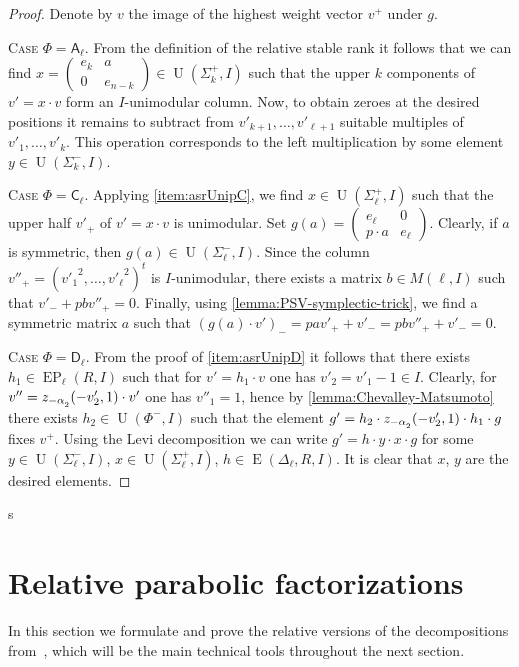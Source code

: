 \documentclass[oneside, 12pt]{amsart}
\theoremstyle{plain}
\numberwithin{equation}{section}
\numberwithin{lemma}{section}
\theoremstyle{definition}
\theoremstyle{remark}
\DeclareMathOperator{\E}{E}
\DeclareMathOperator{\EP}{EP}
\DeclareMathOperator{\U}{U}
\newcommand{\rA}{\mathsf{A}}
\newcommand{\rC}{\mathsf{C}}
\newcommand{\rD}{\mathsf{D}}
\def\ssub#1{\mathchoice
   {_{\lower2pt\hbox{$\scriptstyle #1$}}}
   {_{\lower2pt\hbox{$\scriptstyle #1$}}}
   {_{\lower1.5pt\hbox{$\scriptscriptstyle #1$}}}
   {_{\!\lower1.5pt\hbox{$\scriptscriptstyle #1$}}}}
\begin{document}
\begin{proof} Denote by $v$ the image of the highest weight vector $v^+$ under $g$.

\textsc{Case $\Phi=\rA_\ell$.} From the definition of the relative stable rank it follows that we can find 
$x= \left(\begin{smallmatrix} e_k & a \\ 0 & e_{n-k} \end{smallmatrix}\right) \in \U(\Sigma_k^+, I)$ such that 
the upper $k$ components of $v'= x \cdot v$ form an $I$-unimodular column. 
Now, to obtain zeroes at the desired positions it remains to subtract from $v'_{k+1},\ldots, v'_{\ell+1}$ suitable multiples of $v'_1, \ldots, v'_k$.
This operation corresponds to the left multiplication by some element $y\in\U(\Sigma_k^-, I)$.

\textsc{Case $\Phi=\rC_\ell$.} 
Applying \cref{item:asrUnipC}, we find $x \in \U(\Sigma_\ell^+, I)$ such that the upper half $v'_+$ of $v' = x \cdot v$ is unimodular.
Set $g(a) = \left(\begin{smallmatrix} e_\ell & 0 \\ p \cdot a & e_{\ell} \end{smallmatrix}\right)$.
Clearly, if $a$ is symmetric, then $g(a) \in \U(\Sigma_\ell^-, I)$.
Since the column $v''_+ = ({v'_1}^2, \ldots, {v'_\ell}^2)^t$ is $I$-unimodular, there exists a matrix $b \in M(\ell, I)$ such that $v'_- + p b v''_+ = 0$.
Finally, using \cref{lemma:PSV-symplectic-trick}, we find a symmetric matrix $a$ such that $(g(a) \cdot v')_- = p a v'_+ + v'_- = p b v''_+ + v'_- = 0$.

\textsc{Case $\Phi=\rD_\ell$.} From the proof of \cref{item:asrUnipD} it follows that there exists $h_1 \in \EP_\ell(R, I)$ such that for $v'=h_1\cdot v$ one has $v'_2=v'_1-1\in I$.
Clearly, for $v'' = z_{-\alpha\ssub{2}}(-v'_2, 1)\cdot v'$ one has $v''_1=1$, hence by \cref{lemma:Chevalley-Matsumoto} there exists $h_2 \in \U(\Phi^-, I)$ such that the element
$g'=h_2 \cdot z_{-\alpha\ssub{2}}(-v'_2, 1) \cdot h_1 \cdot g$ fixes $v^+$. 
Using the Levi decomposition we can write $g'=h \cdot y \cdot x \cdot g$ for some $y\in\U(\Sigma^-_\ell, I)$, $x \in \U(\Sigma^+_\ell, I)$, $h\in\E(\Delta_\ell, R, I)$.
It is clear that $x$, $y$ are the desired elements.
\end{proof}s

\section{Relative parabolic factorizations} \label{sec:factorizations}
In this section we formulate and prove the relative versions of the decompositions from~\cite{St78}, which will be the main technical tools throughout the next section.
\end{document}
